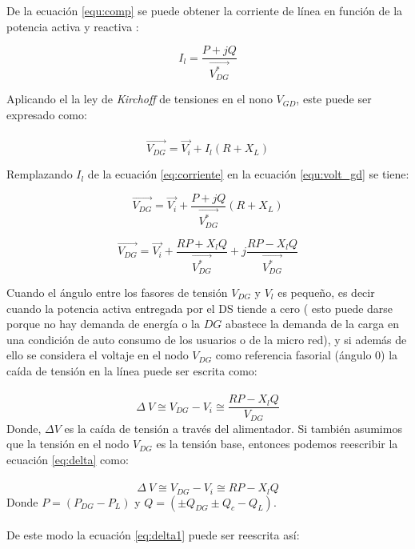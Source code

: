 \documentclass[12pt, letterpaper]{report}
\begin{document}
De la ecuación \ref{equ:comp}  se puede obtener  la corriente de línea en función de la potencia activa y reactiva :

\begin{equation}
I_{l}= \dfrac{P + jQ}{\overrightarrow{V_{DG}^{*}}}
\label{eq:corriente}
\end{equation}

Aplicando el la ley de \textit{ Kirchoff } de tensiones en el nono  $V_{GD}$, este  puede ser expresado como:\\\\
\begin{equation}
\label{equ:volt_gd}
\overrightarrow{V_{DG}}= \overrightarrow{V_{i}} + I_{l}(R + X_{L})
\end{equation}

Remplazando $ I_{l} $ de  la ecuación \ref{eq:corriente} en la ecuación  \ref{equ:volt_gd} se tiene:

\[\overrightarrow{V_{DG}}= \overrightarrow{V_{i}} + \dfrac{P + jQ}{\overrightarrow{V_{DG}^{*}}}(R + X_{L})\]

\begin{equation}
\overrightarrow{V_{DG}}= \overrightarrow{V_{i}} + \dfrac{RP + X_{l}Q}{\overrightarrow{V_{DG}^{*}}} + j\dfrac{RP - X_{l}Q }{\overrightarrow{V_{DG}^{*}}}
\end{equation}

Cuando el ángulo entre los fasores de tensión  $V_{DG}$  y $V_{l}$ es pequeño, es decir cuando la potencia activa entregada por el DS tiende a cero \cite{Akagi2017} (  esto puede darse porque no hay demanda de energía o la $DG$ abastece la demanda de la carga en una condición de auto consumo de los usuarios o de la micro red), y si además de ello se considera el voltaje en el nodo $V_{DG}$ como referencia fasorial (ángulo 0) la caída de tensión en la línea puede ser escrita como:\\\\
\begin{equation}
\Delta\ V \cong V_{DG} - V_{i}\cong \dfrac{RP - X_{l}Q }{V_{DG}}
\label{eq:delta} 
\end{equation}
Donde, $\Delta V$ es la caída de tensión a través del alimentador. Si también asumimos que la tensión en el nodo  $V_{DG}$  es la tensión base, entonces podemos reescribir la ecuación \ref{eq:delta} como:\\\\
\begin{equation}
\Delta\ V \cong V_{DG} - V_{i}\cong RP - X_{l}Q 
\label{eq:delta1} 
\end{equation}
Donde $P=(P_{DG}-P_{L})$  y  $ Q = (\pm Q_{DG} \pm Q_{c} - Q_{L})$.\\\\
De este modo la ecuación \ref{eq:delta1} puede ser reescrita así:
\end{document}
